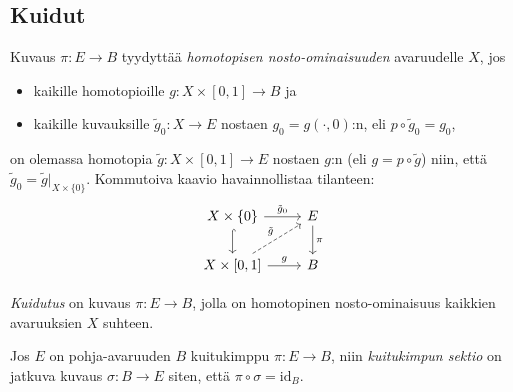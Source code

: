 \subsection{Kuidut}
\begin{maaritelma}
    Kuvaus $\pi:E\to B$ tyydyttää \emph{homotopisen nosto-ominaisuuden} avaruudelle $X$, jos
    \begin{itemize}
        \item kaikille homotopioille $g:X\times[0,1]\to B$ ja
        \item kaikille kuvauksille $\tilde g_0:X\to E$ nostaen $g_0=g(\cdot,0)$:n, eli $p\circ\tilde g_0=g_0$,
    \end{itemize}
    on olemassa homotopia $\tilde g:X\times[0,1]\to E$ nostaen $g$:n (eli $g=p\circ\tilde g$) niin, että $\tilde g_0=\tilde g|_{X\times\{0\}}$. Kommutoiva kaavio havainnollistaa tilanteen:
    \begin{equation}
        \begin{tikzcd}
            X\times\{0\} \arrow[r, "\tilde g_0"] \arrow[d, hook] & E \arrow[d, "\pi"] \\
            X\times[0,1] \arrow[ur, dashrightarrow, "\tilde g"] \arrow[r, "g"] & B
        \end{tikzcd}
    \end{equation}
\end{maaritelma}
\begin{maaritelma}
    \emph{Kuidutus} on kuvaus $\pi:E\to B$, jolla on homotopinen nosto-ominaisuus kaikkien avaruuksien $X$ suhteen.
\end{maaritelma}
\begin{maaritelma}
    Jos $E$ on pohja-avaruuden $B$ kuitukimppu $\pi:E\to B$, niin \emph{kuitukimpun sektio} on jatkuva kuvaus $\sigma:B\to E$ siten, että $\pi\circ\sigma=\text{id}_B$.
\end{maaritelma}


